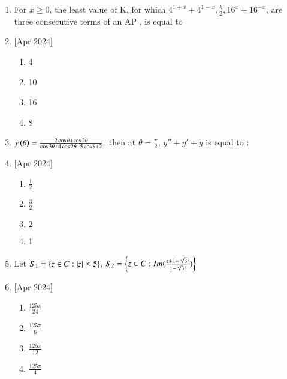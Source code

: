 \documentclass[journal]{IEEEtran}
\begin{document}
\begin{enumerate}
    \item For $x\geq 0$, the least value of K, for which $4^{1+x} +4^{1-x}, \frac{k}{2}, 16^x +16^{-x}$, are three consecutive terms of an AP , is equal to
     \item{[Apr 2024]}
\begin{multicols}{4}
            \begin{enumerate}
              \item 4
              \item 10
              \item 16
              \item 8
            \end{enumerate}
        \end{multicols}
    \item $y\left(\theta\right)=\frac{2\cos{\theta}+\cos{2\theta}}{\cos{3\theta}+4\cos{2\theta}+5\cos{\theta}+2}$, then at $\theta=\frac{\pi}{2}$, $y''+y'+y$ is equal to :
     \item{[Apr 2024]}
    \begin{multicols}{4}
            \begin{enumerate}
              \item $\frac{1}{2}$
              \item $\frac{3}{2}$
              \item $2$
              \item 1
            \end{enumerate}
        \end{multicols}
    \item Let $S_1=\left\{z \in C: \left\vert z\right\vert\leq 5\right\}$, $S_2=\left\{z \in C :Im(\frac{z+1-\sqrt{3}i}{1-\sqrt{3}i})\right\}$
     \item{[Apr 2024]}
    \begin{multicols}{4}
            \begin{enumerate}
              \item $\frac{125\pi}{24}$
              \item $\frac{125\pi}{6}$
              \item $\frac{125\pi}{12}$
              \item $\frac{125\pi}{4}$
            \end{enumerate}
        \end{multicols}
     

\end{enumerate}
\end{document}

